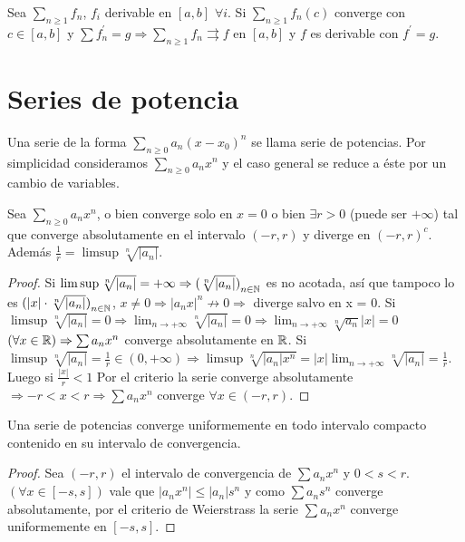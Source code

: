 \begin{corollary}
  Sea \(\sum_{n \geq 1} f_n\), \(f_i\) derivable en \([a, b]\) \(\forall i\). Si \(\sum_{n \geq 1} f_n(c)\) converge con \(c \in [a, b]\) y \(\sum f_n^{\prime} = g \Rightarrow \sum_{n \geq 1} f_n \rightrightarrows f\) en \([a, b]\) y \(f\) es derivable con \(f^{\prime} = g\).
\end{corollary}

\section{Series de potencia}

Una serie de la forma \(\sum_{n \geq 0} a_n(x - x_0)^n\) se llama serie de potencias. Por simplicidad consideramos \(\sum_{n \geq 0} a_n x^n\) y el caso general se reduce a éste por un cambio de variables.

\begin{theorem}
  Sea \(\sum_{n \geq 0} a_n x^n\), o bien converge solo en \(x = 0\) o bien \(\exists r > 0\) (puede ser \(+\infty \)) tal que converge absolutamente en el intervalo \((-r, r)\) y diverge en \({(-r, r)}^c\). Además \(\frac{1}{r} = \limsup \sqrt[n]{|a_n|} \).
  \begin{proof}
    Si \(\limsup \sqrt[n]{|a_n|} = +\infty \Rightarrow {(\sqrt[n]{|a_n|})}_{n \in \mathbb{N}} \) es no acotada, así que tampoco lo es \({(|x| \cdot \sqrt[n]{|a_n|})}_{n \in \mathbb{N}} \), \(x \neq 0 \Rightarrow |a_n x|^n \not \to 0 \Rightarrow \) diverge salvo en x = 0.
    Si \(\limsup \sqrt[n]{|a_n|} = 0 \Rightarrow \lim_{n \to +\infty} \sqrt[n]{|a_n|} = 0 \Rightarrow \lim_{n \to +\infty} \sqrt[n]{a_n} |x| = 0\) \((\forall x \in \mathbb{R}) \Rightarrow \sum a_n x^n\) converge absolutamente en \(\mathbb{R} \).
    Si \(\limsup \sqrt[n]{|a_n|} = \frac{1}{r} \in (0, +\infty) \Rightarrow \limsup \sqrt[n]{|a_n| x^n} = |x| \lim_{n \to +\infty} \sqrt[n]{|a_n|} = \frac{1}{r} \). Luego si \(\frac{|x|}{r} < 1\) Por el criterio la serie converge absolutamente \(\Rightarrow -r < x < r \Rightarrow \sum a_n x^n\) converge \(\forall x \in (-r , r)\).
  \end{proof}
\end{theorem}

\begin{theorem}
  Una serie de potencias converge uniformemente en todo intervalo compacto contenido en su intervalo de convergencia.
  \begin{proof}
    Sea \((-r, r)\) el intervalo de convergencia de \(\sum a_n x^n\) y \(0 < s < r\). \((\forall x \in [-s, s])\) vale que \(|a_n x^n| \leq |a_n| s^n\) y como \(\sum a_n s^n\) converge absolutamente, por el criterio de Weierstrass la serie \(\sum a_n x^n\) converge uniformemente en \([-s, s]\).
  \end{proof}
\end{theorem}

